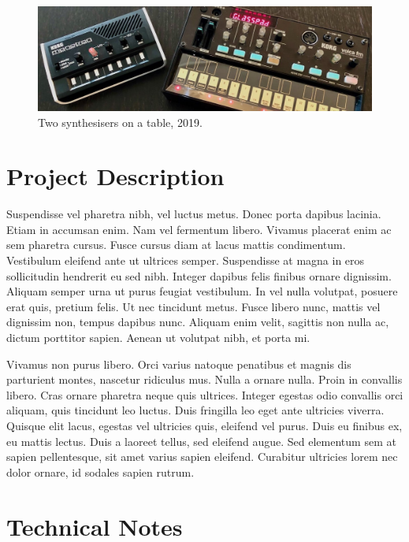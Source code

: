 \documentclass[acmsmall]{nimeart}
\begin{document}
\begin{figure}[h]
  \centering
  \includegraphics[width=\linewidth]{images/sampleteaser.pdf}
  \caption{Two synthesisers on a table, 2019.}
\end{figure}

\section{Project Description}

Suspendisse vel pharetra nibh, vel luctus metus. Donec porta dapibus lacinia. Etiam in accumsan enim. Nam vel fermentum libero. Vivamus placerat enim ac sem pharetra cursus. Fusce cursus diam at lacus mattis condimentum. Vestibulum eleifend ante ut ultrices semper. Suspendisse at magna in eros sollicitudin hendrerit eu sed nibh. Integer dapibus felis finibus ornare dignissim. Aliquam semper urna ut purus feugiat vestibulum. In vel nulla volutpat, posuere erat quis, pretium felis. Ut nec tincidunt metus. Fusce libero nunc, mattis vel dignissim non, tempus dapibus nunc. Aliquam enim velit, sagittis non nulla ac, dictum porttitor sapien. Aenean ut volutpat nibh, et porta mi.

Vivamus non purus libero. Orci varius natoque penatibus et magnis dis parturient montes, nascetur ridiculus mus. Nulla a ornare nulla. Proin in convallis libero. Cras ornare pharetra neque quis ultrices. Integer egestas odio convallis orci aliquam, quis tincidunt leo luctus. Duis fringilla leo eget ante ultricies viverra. Quisque elit lacus, egestas vel ultricies quis, eleifend vel purus. Duis eu finibus ex, eu mattis lectus. Duis a laoreet tellus, sed eleifend augue. Sed elementum sem at sapien pellentesque, sit amet varius sapien eleifend. Curabitur ultricies lorem nec dolor ornare, id sodales sapien rutrum.

\section{Technical Notes}
\end{document}
